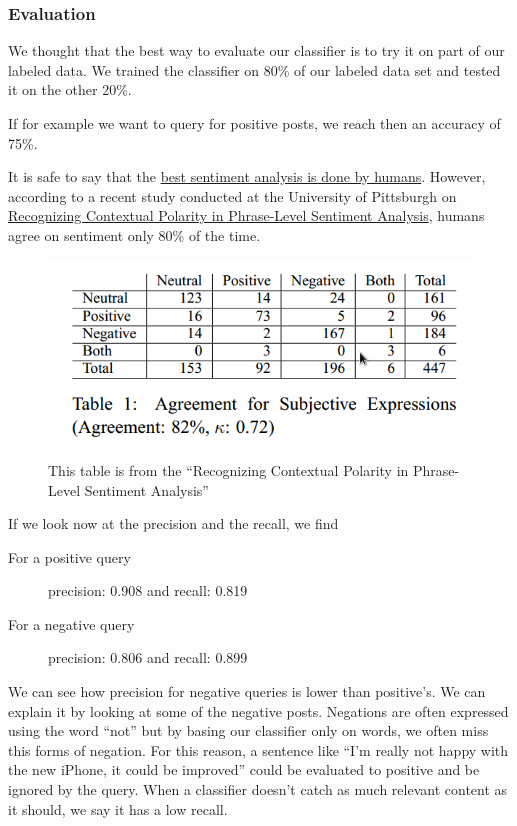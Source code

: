 \subsubsection*{Evaluation}
We thought that the best way to evaluate our classifier is to try it on part of our labeled data.
We trained the classifier on 80\% of our labeled data set and tested it on the other 20\%.

If for example we want to query for positive posts, we reach then an accuracy of 75\%. 

It is safe to say that the \href{http://www.webmetricsguru.com/archives/2010/04/sentiment-analysis-best-done-by-humans/}{best sentiment analysis is done by humans}. However, according to a recent 
study conducted at the University of Pittsburgh on 
\href{http://people.cs.pitt.edu/~wiebe/pubs/papers/emnlp05polarity.pdf}{Recognizing Contextual Polarity in Phrase-Level Sentiment Analysis}, 
humans agree on sentiment only 80\% of the time.


\begin{figure}[h]
\centering
\includegraphics[scale=.5]{images/sent1.png}
\caption{This table is from the ``Recognizing Contextual Polarity in Phrase-Level Sentiment Analysis''}
\end{figure}

If we look now at the precision and the recall, we find

\begin{description}
 \item[For a positive query] 
 
  precision: 0.908 and 
  recall: 0.819
 

 \item[For a negative query]
 
  precision: 0.806 and
  recall: 0.899
 
\end{description}

We can see how precision for negative queries is lower than positive’s. We can explain it by looking at some of the negative posts. 
Negations are often expressed using the word “not” but by basing our classifier only on words, we often miss this forms of negation. 
For this reason, a sentence like “I’m really not happy with the new iPhone, it could be improved” could be evaluated to positive and be 
ignored by the query. When a classifier doesn’t catch as much relevant content as it should, we say it has a low recall.

